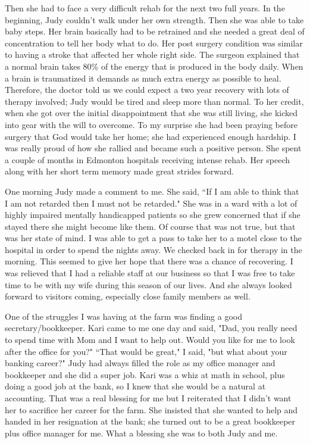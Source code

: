 \documentclass[oneside]{book}
\begin{document}
Then she had to face a very difficult rehab for the next two full years. In the beginning, Judy couldn't walk under her own strength. Then she was able to take baby steps. Her brain basically had to be retrained and she needed a great deal of concentration to tell her body what to do. Her post surgery condition was similar to having a stroke that affected her whole right side. The surgeon explained that a normal brain takes 80\% of the energy that is produced in the body daily. When a brain is traumatized it demands as much extra energy as possible to heal. Therefore, the doctor told us we could expect a two year recovery with lots of therapy involved; Judy would be tired and sleep more than normal. To her credit, when she got over the initial disappointment that she was still living, she kicked into gear with the will to overcome. To my surprise she had been praying before surgery that God would take her home; she had experienced enough hardship. I was really proud of how she rallied and became such a positive person. She spent a couple of months in Edmonton hospitals receiving intense rehab. Her speech along with her short term memory made great strides forward. 

One morning Judy made a comment to me. She said, ``If I am able to think that I am not retarded then I must not be retarded." She was in a ward with a lot of highly impaired mentally handicapped patients so she grew concerned that if she stayed there she might become like them. Of course that was not true, but that was her state of mind. I was able to get a pass to take her to a motel close to the hospital in order to spend the nights away.  We checked back in for therapy in the morning. This seemed to give her hope that there was a chance of recovering. I was relieved that I had a reliable staff at our business so that I was free to take time to be with my wife during this season of our lives. And she always looked forward to visitors coming, especially close family members as well.

One of the struggles I was having at the farm was finding a good secretary/bookkeeper. Kari came to me one day and said, "Dad, you really need to spend time with Mom and I want to help out. Would you like for me to look after the office for you?" ``That would be great," I said, "but what about your banking career?" Judy had always filled the role as my office manager and bookkeeper and she did a super job. Kari was a whiz at math in school, plus doing a good job at the bank, so I knew that she would be a natural at accounting. That was a real blessing for me but I reiterated that I didn't want her to sacrifice her career for the farm. She insisted that she wanted to help and handed in her resignation at the bank; she turned out to be a great bookkeeper plus office manager for me. What a blessing she was to both Judy and me.
\end{document}
